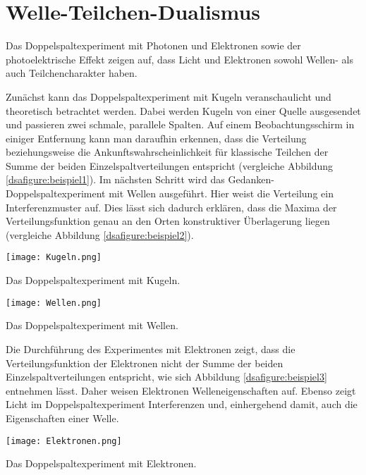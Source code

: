 \section{Welle-Teilchen-Dualismus}

Das Doppelspaltexperiment mit Photonen und Elektronen sowie der photoelektrische Effekt zeigen auf, dass Licht und Elektronen sowohl Wellen- als auch Teilchencharakter haben.

Zunächst kann das Doppelspaltexperiment mit Kugeln veranschaulicht und theoretisch betrachtet werden. Dabei werden Kugeln von einer Quelle ausgesendet und passieren zwei schmale, parallele Spalten. Auf einem Beobachtungsschirm in einiger Entfernung kann man daraufhin erkennen, dass die Verteilung beziehungsweise die Ankunftswahrscheinlichkeit für klassische Teilchen der Summe der beiden Einzelspaltverteilungen entspricht (vergleiche Abbildung \ref{dsafigure:beispiel1}). Im nächsten Schritt wird das Gedanken-Doppelspaltexperiment mit Wellen ausgeführt. Hier weist die Verteilung ein Interferenzmuster auf. Dies lässt sich dadurch erklären, dass die Maxima der Verteilungsfunktion genau an den Orten konstruktiver Überlagerung liegen (vergleiche Abbildung \ref{dsafigure:beispiel2}). 

\begin{dsafigure}
\centering
\texttt{[image: Kugeln.png]}
\caption{Das Doppelspaltexperiment mit Kugeln. \cite{Doppelspalt}}
\label{dsafigure:beispiel1}
\end{dsafigure}

\begin{dsafigure}
\centering
\texttt{[image: Wellen.png]}
\caption{Das Doppelspaltexperiment mit Wellen. \cite{Doppelspalt}}
\label{dsafigure:beispiel2}
\end{dsafigure}

Die Durchführung des Experimentes mit Elektronen zeigt, dass die Verteilungsfunktion der Elektronen nicht der Summe der beiden Einzelspaltverteilungen entspricht, wie sich Abbildung \ref{dsafigure:beispiel3} entnehmen lässt. Daher weisen Elektronen Welleneigenschaften auf. Ebenso zeigt Licht im Doppelspaltexperiment Interferenzen und, einhergehend damit, auch die Eigenschaften einer Welle. 

\begin{dsafigure}
\centering
\texttt{[image: Elektronen.png]}
\caption{Das Doppelspaltexperiment mit Elektronen. \cite{Doppelspalt}}
\label{dsafigure:beispiel3}
\end{dsafigure}

